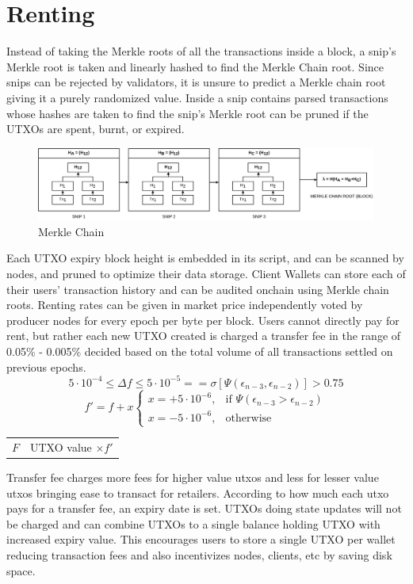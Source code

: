 \documentclass[a4paper,10pt]{article}
\makeatletter
\newenvironment{conditions}
  {\par\vspace{\abovedisplayskip}\noindent\begin{tabular}{>{$}l<{$} @{${}={}$} l}}
  {\end{tabular}\par\vspace{\belowdisplayskip}}
\makeatother
\begin{document}
\section{Renting}
Instead of taking the Merkle roots of all the transactions inside a block, a snip's Merkle root is taken and linearly hashed to find the Merkle Chain root. Since snips can be rejected by validators, it is unsure to predict a Merkle chain root giving it a purely randomized value. Inside a snip contains parsed transactions whose hashes are taken to find the snip's Merkle root can be pruned if the UTXOs are spent, burnt, or expired. 
\begin{figure}[h]
\begin{center}
\includegraphics[width=13cm]{merklechain}
\caption{Merkle Chain}
\end{center}
\end{figure}
Each UTXO expiry block height is embedded in its script, and can be scanned by nodes, and pruned to optimize their data storage. Client Wallets can store each of their users' transaction history and can be audited onchain using Merkle chain roots. Renting rates can be given in market price independently voted by producer nodes for every epoch per byte per block. Users cannot directly pay for rent, but rather each new UTXO created is charged a transfer fee in the range of 0.05\% - 0.005\% decided based on the total volume of all transactions settled on previous epochs.
\begin{equation*}
5 \cdot 10^{-4} \leq \Delta f \leq 5 \cdot 10^{-5} == \sigma [\Psi (\epsilon_{n-3}, \epsilon_{n-2})] > 0.75
\end{equation*}
\begin{equation*}
f'=f+x \begin{cases}
x=+5 \cdot 10^{-6}, & \text{if } \Psi (\epsilon_{n-3} > \epsilon_{n-2})\\
x=-5 \cdot 10^{-6}, & \text{otherwise}
\end{cases}
\end{equation*}
\begin{conditions}
F & UTXO value $\times f'$ 
\end{conditions}
 Transfer fee charges more fees for higher value utxos and less for lesser value utxos bringing ease to transact for retailers. According to how much each utxo pays for a transfer fee, an expiry date is set. UTXOs doing state updates will not be charged and can combine UTXOs to a single balance holding UTXO with increased expiry value. This encourages users to store a single UTXO per wallet reducing transaction fees and also incentivizes nodes, clients, etc by saving disk space.  
\end{document}
